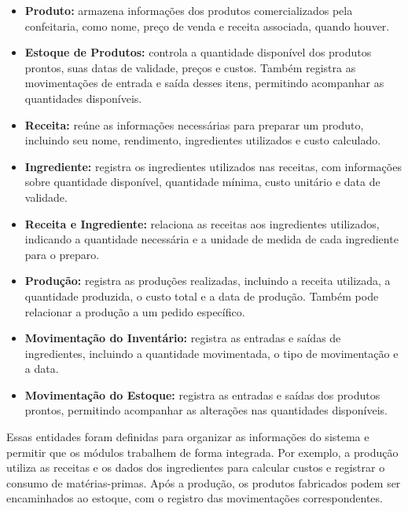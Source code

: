 \begin{itemize}
    \item \textbf{Produto:} armazena informações dos produtos comercializados pela confeitaria, como nome, preço de venda e receita associada, quando houver.

    \item \textbf{Estoque de Produtos:} controla a quantidade disponível dos produtos prontos, suas datas de validade, preços e custos. Também registra as movimentações de entrada e saída desses itens, permitindo acompanhar as quantidades disponíveis.

    \item \textbf{Receita:} reúne as informações necessárias para preparar um produto, incluindo seu nome, rendimento, ingredientes utilizados e custo calculado.

    \item \textbf{Ingrediente:} registra os ingredientes utilizados nas receitas, com informações sobre quantidade disponível, quantidade mínima, custo unitário e data de validade.

    \item \textbf{Receita e Ingrediente:} relaciona as receitas aos ingredientes utilizados, indicando a quantidade necessária e a unidade de medida de cada ingrediente para o preparo.

    \item \textbf{Produção:} registra as produções realizadas, incluindo a receita utilizada, a quantidade produzida, o custo total e a data de produção. Também pode relacionar a produção a um pedido específico.

    \item \textbf{Movimentação do Inventário:} registra as entradas e saídas de ingredientes, incluindo a quantidade movimentada, o tipo de movimentação e a data.

    \item \textbf{Movimentação do Estoque:} registra as entradas e saídas dos produtos prontos, permitindo acompanhar as alterações nas quantidades disponíveis.
\end{itemize}

Essas entidades foram definidas para organizar as informações do sistema e permitir que os módulos trabalhem de forma integrada. Por exemplo, a produção utiliza as receitas e os dados dos ingredientes para calcular custos e registrar o consumo de matérias-primas. Após a produção, os produtos fabricados podem ser encaminhados ao estoque, com o registro das movimentações correspondentes.

